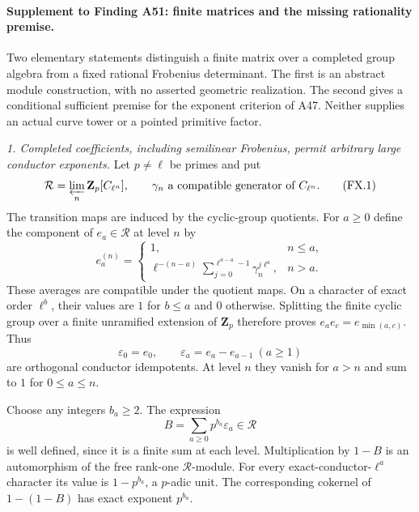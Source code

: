 \paragraph{Supplement to Finding A51: finite matrices and the missing rationality premise.}
Two elementary statements distinguish a finite matrix over a completed
group algebra from a fixed rational Frobenius determinant. The first is
an abstract module construction, with no asserted geometric realization.
The second gives a conditional sufficient premise for the exponent
criterion of A47. Neither supplies an actual curve tower or a pointed
primitive factor.

\emph{1. Completed coefficients, including semilinear Frobenius, permit
arbitrary large conductor exponents.}
Let $p\ne\ell$ be primes and put
\[
 \mathcal R=\varprojlim_n\mathbf Z_p[C_{\ell^n}],
 \qquad \gamma_n\text{ a compatible generator of }C_{\ell^n}.
 \tag{FX.1}
\]
The transition maps are induced by the cyclic-group quotients.
For $a\ge0$ define the component of $e_a\in\mathcal R$ at level $n$ by
\[
 e_a^{(n)}=
 \begin{cases}
 1,&n\le a,\\[1mm]
 \displaystyle\ell^{-(n-a)}
       \sum_{j=0}^{\ell^{n-a}-1}\gamma_n^{j\ell^a},&n>a.
 \end{cases}
 \tag{FX.2}
\]
These averages are compatible under the quotient maps. On a character
of exact order $\ell^b$, their values are $1$ for $b\le a$ and $0$
otherwise. Splitting the finite cyclic group over a finite unramified
extension of $\mathbf Z_p$ therefore proves
$e_ae_c=e_{\min(a,c)}$. Thus
\[
 \varepsilon_0=e_0,\qquad \varepsilon_a=e_a-e_{a-1}\ (a\ge1)
 \tag{FX.3}
\]
are orthogonal conductor idempotents. At level $n$ they vanish for
$a>n$ and sum to $1$ for $0\le a\le n$.

Choose any integers $b_a\ge2$. The expression
\[
 B=\sum_{a\ge0}p^{b_a}\varepsilon_a\in\mathcal R
 \tag{FX.4}
\]
is well defined, since it is a finite sum at each level. Multiplication
by $1-B$ is an automorphism of the free rank-one $\mathcal R$-module.
For every exact-conductor-$\ell^a$ character its value is
$1-p^{b_a}$, a $p$-adic unit. The corresponding cokernel of
$1-(1-B)$ has exact exponent $p^{b_a}$.

